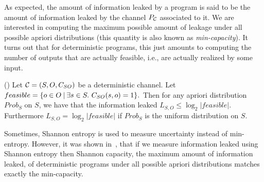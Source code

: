 As expected, the amount of information leaked by a program is said to be the amount of information leaked by the channel $P_{\mathcal{C}}$ associated to it.  
We are interested in computing the maximum possible amount of leakage under all possible apriori distributions (this quantity is  also known as \emph{min-capacity}). It turns out that for deterministic programs, this just amounts to computing the number  of outputs that are actually feasible, i.e., are actually realized by some input.

\begin{mythm} (\cite{Smith}) Let $\mathcal{C}=(S,O, C_{SO})$ be a deterministic channel. Let 
$feasible=\{ o\in O \mathbin{|} \exists s\in S.\ C_{SO}(s,o)=1 \}.$  Then for any apriori distribution $Prob_S$ on $S$, we have that the information leaked
$ L_{S,O} \leq \log_2 |feasible|.$ Furthermore $ L_{S,O} = \log_2 |feasible|$ if $Prob_S$ is the uniform distribution on $S.$
\end{mythm}

\begin{remark}
Sometimes, Shannon entropy is used to measure uncertainty instead of min-entropy. However, it was shown in~\cite{Smith}, that if we measure information leaked using Shannon entropy then Shannon capacity, the maximum amount of information leaked, of deterministic programs under all possible apriori distributions  matches exactly the min-capacity. 
\end{remark}